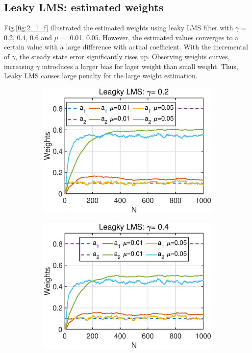 \subsection{Leaky LMS: estimated weights}
Fig.\ref{fig:2_1_f} illustrated the estimated weights using leaky LMS filter with $\gamma=$ 0.2, 0.4, 0.6 and $\mu=$ 0.01, 0.05. However, the estimated values converges to a certain value with a large difference with actual coefficient. With the incremental of $\gamma$, the steady state error significantly rises up. Observing weights curves, increasing $\gamma$ introduces a larger bias for lager weight than small weight. Thus, Leaky LMS causes large penalty for the large weight estimation.
\begin{figure}[htb]
     \centering
      \hspace{-0.4cm}
     \begin{subfigure}[b]{0.33\textwidth}
         \centering
         \includegraphics[width=\textwidth]{fig/21/21f1.eps}
     \end{subfigure}
     \hspace{-0.4cm}
     \begin{subfigure}[b]{0.33\textwidth}
         \centering
         \includegraphics[width=\textwidth]{fig/21/21f2.eps}

\end{subfigure}
\end{figure}
